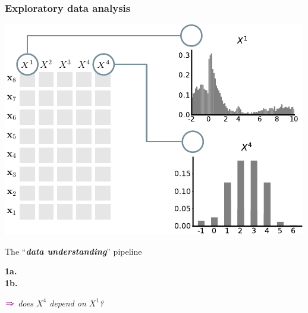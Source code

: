 \documentclass[xcolor={usenames,dvipsnames,svgnames}, compress, aspectratio=169, 11pt]{beamer}
\newcommand{\comment}[3][\small]{\begin{minipage}{1\linewidth}
          \raggedleft
          {
            $\color{violet}\boldsymbol\Rightarrow$
            #1
            {\emph{#2}}
          }
      \end{minipage}#3\\
}
\begin{document}
\begin{frame}[t, htt=bgrey2]
  \frametitle{Exploratory data analysis}

  \large
  \begin{minipage}[t]{0.6\linewidth}
    \vspace{5pt}
    \includegraphics[width=.9\linewidth]{figures/abda-hist-type}
  \end{minipage}\hfill\begin{minipage}[t]{0.4\linewidth}
    \vspace{10pt}
    {The ``\emph{\textbf{data understanding}}'' pipeline}\\[3pt]
    \raggedleft\begin{minipage}[t]{.9\linewidth}
      {\textbf{1a.} \\[-2pt]}
      {\textbf{1b.}\hspace{0pt} \\[5pt]}
    \comment[\normalsize]{does $X^{4}$ depend on $X^{1}$?}{}
    \end{minipage}    
  \end{minipage}  
\end{frame}
\end{document}

